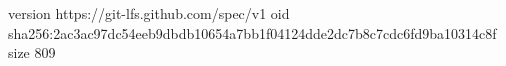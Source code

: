 version https://git-lfs.github.com/spec/v1
oid sha256:2ac3ac97dc54eeb9dbdb10654a7bb1f04124dde2dc7b8c7cdc6fd9ba10314c8f
size 809
